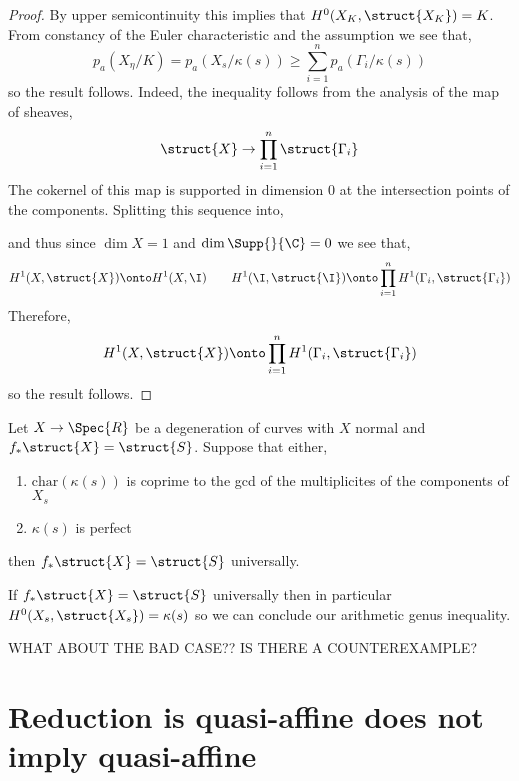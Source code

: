 \documentclass[12pt]{article}
\begin{document}
\begin{proof}
By upper semicontinuity this implies that $H^0(X_K, \struct{X_K}) = K$.
From constancy of the Euler characteristic and the assumption we see that,
\[ p_a(X_\eta  / K) = p_a(X_s / \kappa(s)) \ge \sum_{i = 1}^n p_a(\Gamma_i / \kappa(s)) \]
so the result follows. Indeed, the inequality follows from the analysis of the map of sheaves,
\[ \struct{X} \to \prod_{i = 1}^n \struct{\Gamma_i} \]
The cokernel of this map is supported in dimension $0$ at the intersection points of the components. Splitting this sequence into,
\begin{center}
\end{center}
and thus since $\dim{X} = 1$ and $\dim{\Supp{}{\C}} = 0$ we see that,
\[ H^1(X, \struct{X}) \onto H^1(X, \I) \quad \quad H^1(\I, \struct{\I}) \onto \prod_{i = 1}^n H^1(\Gamma_i, \struct{\Gamma_i}) \]
Therefore,
\[ H^1(X, \struct{X}) \onto \prod_{i = 1}^n H^1(\Gamma_i, \struct{\Gamma_i}) \]
so the result follows.
\end{proof}

\begin{theorem}[Raynaud]
Let $X \to \Spec{R}$ be a degeneration of curves with $X$ normal and $f_* \struct{X} = \struct{S}$. Suppose that either,
\begin{enumerate}
\item $\mathrm{char}(\kappa(s))$ is coprime to the gcd of the multiplicites of the components of $X_s$
\item $\kappa(s)$ is perfect
\end{enumerate}
then $f_* \struct{X} = \struct{S}$ universally.
\end{theorem}

\begin{rmk}
If $f_* \struct{X} = \struct{S}$ universally then in particular $H^0(X_s, \struct{X_s}) = \kappa(s)$ so we can conclude our arithmetic genus inequality.
\end{rmk}

WHAT ABOUT THE BAD CASE?? IS THERE A COUNTEREXAMPLE?

\section{Reduction is quasi-affine does not imply quasi-affine}
\end{document}
